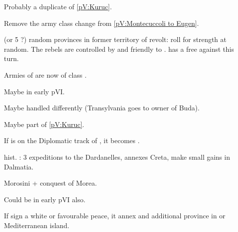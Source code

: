 
\begin{todo}
  Probably a duplicate of \ref{pV:Kuruc}.

  Remove the army class change from \ref{pV:Montecuccoli to Eugen}.
\end{todo}

\phevnt
{} (or 5 ?) random \HAB provinces in former territory of \paysHongrie
revolt: roll for strength at random.
\bparag The rebels are controlled by \TUR and friendly to \TUR.
\aparag \TUR has a free \CB against \HAB this turn.

\phadm
\aparag Armies of \AUSaus are now of class \CAIV.


\begin{todo}
  Maybe in early pVI.

  Maybe handled differently (Transylvania goes to owner of Buda).

  Maybe part of \ref{pV:Kuruc}.
\end{todo}

\phdipl If \paysTransylvanie is on the Diplomatic track of \TUR, it becomes
\Neutral.


\begin{todo}
  hist. : 3 expeditions to the Dardanelles, \TUR annexes Creta, \VEN make
  small gains in Dalmatia.
\end{todo}


\begin{todo}
  Morosini + conquest of Morea.

  Could be in early pVI also.
\end{todo}

\phpaix If \paysVenise sign a white or favourable peace, it annex and
additional province in \regionBalkans or Mediterranean island.



